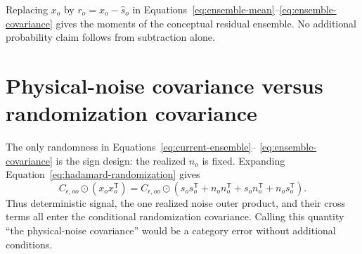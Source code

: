 \documentclass[11pt]{article}
\begin{document}
Replacing $x_o$ by $r_o=x_o-\widehat s_o$ in
Equations~\eqref{eq:ensemble-mean}--\eqref{eq:ensemble-covariance} gives the
moments of the conceptual residual ensemble.  No additional probability
claim follows from subtraction alone.

\section{Physical-noise covariance versus randomization covariance}

The only randomness in Equations~\eqref{eq:current-ensemble}--
\eqref{eq:ensemble-covariance} is the sign design: the realized $n_o$ is
fixed.  Expanding Equation~\eqref{eq:hadamard-randomization} gives
\begin{equation}
  C_{\epsilon,oo}\odot(x_ox_o^{\mathsf T})
  =C_{\epsilon,oo}\odot
  \left(s_os_o^{\mathsf T}+n_on_o^{\mathsf T}
  +s_on_o^{\mathsf T}+n_os_o^{\mathsf T}\right).
  \label{eq:fixed-realization-decomposition}
\end{equation}
Thus deterministic signal, the one realized noise outer product, and their
cross terms all enter the conditional randomization covariance.  Calling this
quantity ``the physical-noise covariance'' would be a category error without
additional conditions.
\end{document}
